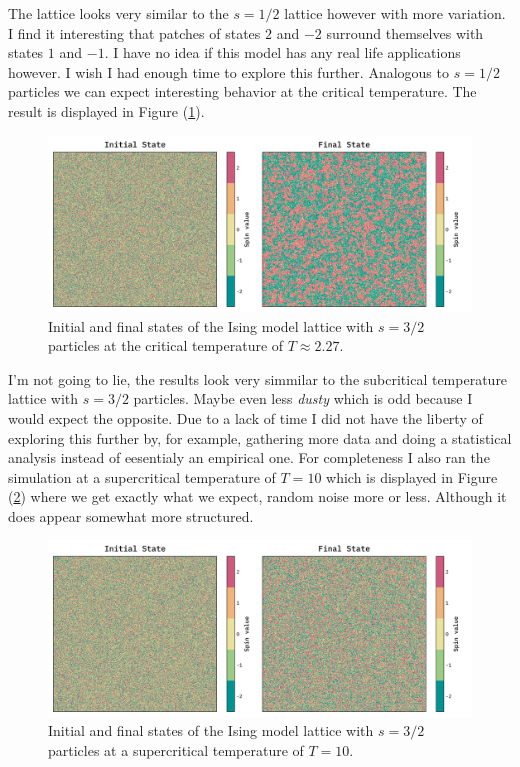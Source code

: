 \documentclass[10pt, titlepage, a4paper]{article}
\begin{document}
The lattice looks very similar to the $s=1/2$ lattice however with more variation. I find it interesting that patches of states $2$ and $-2$ 
surround themselves with states $1$ and $-1$. I have no idea if this model has any real life applications however. I wish I had enough time to 
explore this further. Analogous to $s=1/2$ particles we can expect interesting behavior at the critical temperature. The result is displayed in
Figure (\ref{fig:ising-demo-3/2-critical}).

\begin{figure}[H]
    \centering
    \includegraphics[width=.95\textwidth]{../IsingModel/Images/expanded-state-critical.png}
    \caption{Initial and final states of the Ising model lattice with $s=3/2$ particles at the critical temperature of $T\approx 2.27$.}
    \label{fig:ising-demo-3/2-critical}
\end{figure}

I'm not going to lie, the results look very simmilar to the subcritical temperature lattice with $s=3/2$ particles. Maybe even less \textit{dusty}
which is odd because I would expect the opposite. Due to a lack of time I did not have the liberty of exploring this further by, for example, gathering
more data and doing a statistical analysis instead of eesentialy an empirical one. For completeness I also ran the simulation at a supercritical
temperature of $T=10$ which is displayed in Figure (\ref{fig:ising-demo-3/2-supercrit}) where we get exactly what we expect, random noise more or less.
Although it does appear somewhat more structured.

\begin{figure}[H]
    \centering
    \includegraphics[width=.95\textwidth]{../IsingModel/Images/expanded-state-supercritical.png}
    \caption{Initial and final states of the Ising model lattice with $s=3/2$ particles at a supercritical temperature of $T=10$.}
    \label{fig:ising-demo-3/2-supercrit}
\end{figure}
\end{document}
